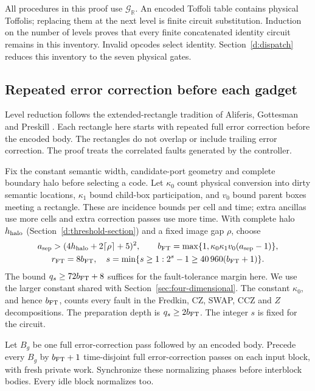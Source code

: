 All procedures in this proof use \(\mathcal G_{\mathbb R}\).
An encoded Toffoli table contains physical Toffolis; replacing them
at the next level is finite circuit substitution. Induction on the
number of levels proves that every finite concatenated identity
circuit remains in this inventory. Invalid opcodes select identity.
Section~\ref{d:dispatch} reduces this inventory to the seven physical gates.

\subsection{Repeated error correction before each gadget}
Level reduction follows the extended-rectangle tradition of Aliferis, Gottesman and Preskill \cite{AGP2006}. Each rectangle here starts with repeated full error correction before the encoded body. The rectangles do not overlap or include trailing error correction. The proof treats the correlated faults generated by the controller.

Fix the constant semantic width, candidate-port geometry and complete
boundary halo before selecting a code. Let \(\kappa_0\) count physical
conversion into dirty semantic locations, \(\kappa_1\) bound child-box
participation, and \(v_0\) bound parent boxes meeting a rectangle.
These are incidence bounds per cell and time; extra ancillas use more
cells and extra correction passes use more time. With complete halo
\(h_{\rm halo}\) (Section~\ref{d:threshold-section}) and a fixed image gap \(\rho\), choose
\begin{gather}
 a_{\rm sep}>(4h_{\rm halo}+2\lceil\rho\rceil+5)^2,
 \qquad b_{\rm FT}=\max\{1,\kappa_0\kappa_1v_0(a_{\rm sep}-1)\},\label{d:budgets}\\*
 r_{\rm FT}=8b_{\rm FT},\quad
 s=\min\{s\ge1:2^s-1\ge40\,960(b_{\rm FT}+1)\}.\label{d:capacity}
\end{gather}
The bound \(q_s\ge72b_{\rm FT}+8\) suffices for the
fault-tolerance margin here. We use the larger constant shared with
Section~\ref{sec:four-dimensional}.
The constant \(\kappa_0\), and hence \(b_{\rm FT}\), counts every fault in the Fredkin, CZ, SWAP, CCZ and \(Z\) decompositions. The preparation depth is
\(q_s\ge2b_{\rm FT}\). The integer \(s\) is fixed for the circuit.

Let \(B_g\) be one full error-correction pass followed by an
encoded body. Precede every \(B_g\) by \(b_{\rm FT}+1\) time-disjoint
full error-correction passes on each input block, with fresh private work. Synchronize
these normalizing phases before interblock bodies. Every idle block
normalizes too.

